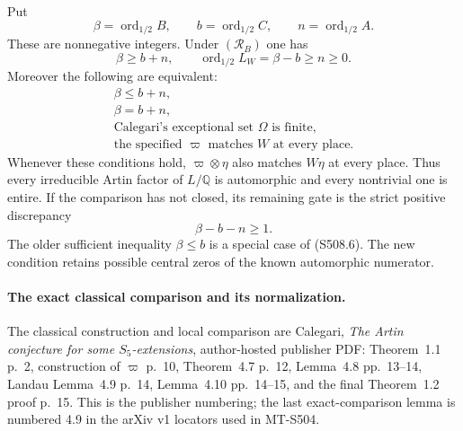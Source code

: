 Put
\[
 \beta=\operatorname{ord}_{1/2} B,\qquad
 b=\operatorname{ord}_{1/2} C,\qquad
 n=\operatorname{ord}_{1/2} A.
 \tag{S508.4}
\]
These are nonnegative integers.  Under $(\mathcal R_B)$ one has
\[
             \beta\ge b+n,
       \qquad \operatorname{ord}_{1/2}L_W=\beta-b\ge n\ge0.
 \tag{S508.5}
\]
Moreover the following are equivalent:
\[
 \begin{gathered}
       \beta\le b+n,\\
       \beta=b+n,\\
       \text{Calegari's exceptional set }\Omega\text{ is finite},\\
       \text{the specified }\varpi\text{ matches }W
             \text{ at every place}.
 \end{gathered}
 \tag{S508.6}
\]
Whenever these conditions hold, $\varpi\otimes\eta$ also matches
$W\eta$ at every place.  Thus every irreducible Artin factor of
$L/\mathbb Q$ is automorphic and every nontrivial one is entire.
If the comparison has not closed, its remaining gate is the
strict positive discrepancy
\[
                        \beta-b-n\ge1.
 \tag{S508.7}
\]
The older sufficient inequality $\beta\le b$ is a special case
of (S508.6).  The new condition retains possible central zeros
of the known automorphic numerator.

\paragraph{The exact classical comparison and its normalization.}
The classical construction and local comparison are Calegari,
\emph{The Artin conjecture for some $S_5$-extensions},
author-hosted publisher PDF: Theorem~1.1 p.~2, construction of
$\varpi$ p.~10, Theorem~4.7 p.~12, Lemma~4.8 pp.~13--14,
Landau Lemma~4.9 p.~14, Lemma~4.10 pp.~14--15, and the final
Theorem~1.2 proof p.~15.  This is the publisher numbering;
the last exact-comparison lemma is numbered 4.9 in the
arXiv v1 locators used in MT-S504.

